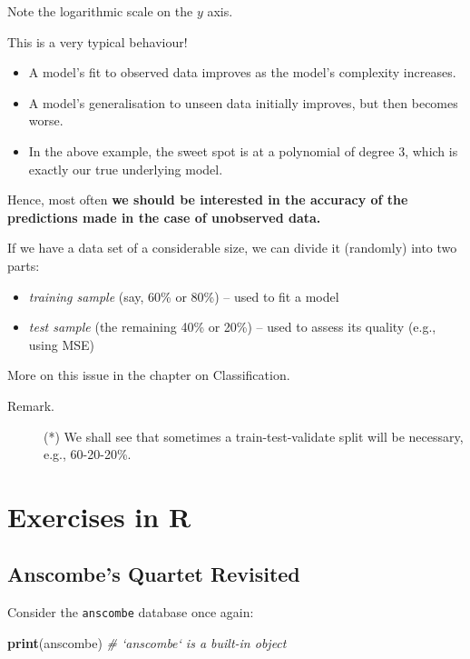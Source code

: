 \documentclass[10pt,b5paper,krantz1]{krantz}
\newenvironment{Shaded}{\begin{snugshade}}{\end{snugshade}}
\newcommand{\CommentTok}[1]{\textcolor[rgb]{0.37,0.37,0.37}{\textit{#1}}}
\newcommand{\KeywordTok}[1]{\textcolor[rgb]{0.27,0.27,0.27}{\textbf{#1}}}
\newcommand{\NormalTok}[1]{#1}
\providecommand{\tightlist}{%
  \setlength{\itemsep}{0pt}\setlength{\parskip}{0pt}}
\begin{document}
Note the logarithmic scale on the \(y\) axis.

This is a very typical behaviour!

\begin{itemize}
\item
  A model's fit to observed data improves as the model's complexity increases.
\item
  A model's generalisation to unseen data initially improves, but then becomes worse.
\item
  In the above example, the sweet spot is at a polynomial of degree 3, which is exactly
  our true underlying model.
\end{itemize}

Hence, most often \textbf{we should be interested in the accuracy of the predictions
made in the case of unobserved data.}

If we have a data set of a considerable size,
we can divide it (randomly) into two parts:

\begin{itemize}
\tightlist
\item
  \emph{training sample} (say, 60\% or 80\%) -- used to fit a model
\item
  \emph{test sample} (the remaining 40\% or 20\%) -- used to assess its quality
  (e.g., using MSE)
\end{itemize}

More on this issue in the chapter on Classification.

\begin{description}
\item[Remark.]
(*) We shall see that sometimes a train-test-validate
split will be necessary, e.g., 60-20-20\%.
\end{description}

\hypertarget{exercises-in-r-1}{%
\section{Exercises in R}\label{exercises-in-r-1}}

\hypertarget{anscombes-quartet-revisited}{%
\subsection{Anscombe's Quartet Revisited}\label{anscombes-quartet-revisited}}

Consider the \texttt{anscombe} database once again:

\begin{Shaded}
\begin{Highlighting}[]
\KeywordTok{print}\NormalTok{(anscombe) }\CommentTok{# `anscombe` is a built-in object}
\end{Highlighting}
\end{Shaded}
\end{document}
